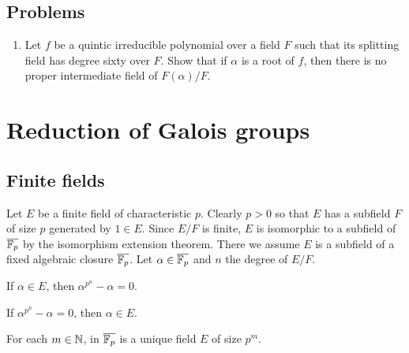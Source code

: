 \documentclass{../../large}
\begin{document}
\section*{Problems}
\begin{enumerate}
\item Let $f$ be a quintic irreducible polynomial over a field $F$ such that its splitting field has degree sixty over $F$. Show that if $\alpha$ is a root of $f$, then there is no proper intermediate field of $F(\alpha)/F$.
\end{enumerate}








\chapter{Reduction of Galois groups}

\section{Finite fields}
\begin{prb}
Let $E$ be a finite field of characteristic $p$.
Clearly $p>0$ so that $E$ has a subfield $F$ of size $p$ generated by $1\in E$.
Since $E/F$ is finite, $E$ is isomorphic to a subfield of $\overline{\mathbb{F}_p}$ by the isomorphism extension theorem.
There we assume $E$ is a subfield of a fixed algebraic closure $\overline{\mathbb{F}_p}$.
Let $\alpha\in\overline{\mathbb{F}_p}$ and $n$ the degree of $E/F$.
\begin{parts}
\item If $\alpha\in E$, then $\alpha^{p^n}-\alpha=0$.
\item If $\alpha^{p^n}-\alpha=0$, then $\alpha\in E$.
\item For each $m\in\mathbb{N}$, in $\overline{\mathbb{F}_p}$ is a unique field $E$ of size $p^m$.
\end{parts}
\end{prb}
\end{document}
